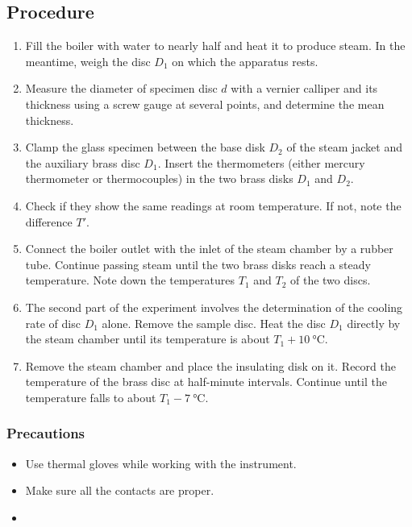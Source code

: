 \documentclass[%
 sor,
 jor,
 amsmath,amssymb,
 reprint,
]{revtex4-2}
\begin{document}
\subsection{Procedure}
\begin{enumerate}
    \item Fill the boiler with water to nearly half and heat it to produce steam. In the meantime, weigh the disc ${D_1}$ on which the apparatus rests.
    \item Measure the diameter of specimen disc $d$ with a vernier calliper and its thickness using a screw gauge at several points, and determine the mean thickness.
    \item Clamp the glass specimen between the base disk ${D_2}$ of the steam jacket and the auxiliary brass disc ${D_1}$. Insert the thermometers (either mercury thermometer or thermocouples) in the two brass disks ${D_1}$ and ${D_2}$.
    \item Check if they show the same readings at room temperature. If not, note the difference $T'$.
    \item Connect the boiler outlet with the inlet of the steam chamber by a rubber tube. Continue passing steam until the two brass disks reach a steady temperature. Note down the temperatures $T_1$ and $T_2$ of the two discs.
    \item The second part of the experiment involves the determination of the cooling rate of disc ${D_1}$ alone. Remove the sample disc. Heat the disc ${D_1}$ directly by the steam chamber until its temperature is about $T_1 + \SI{10}{\celsius}$.
    \item Remove the steam chamber and place the insulating disk on it. Record the temperature of the brass disc at half-minute intervals. Continue until the temperature falls to about $T_1 - \SI{7}{\celsius}$.
\end{enumerate}



\subsubsection{Precautions}
\begin{itemize}
	\item Use thermal gloves while working with the instrument.
	\item Make sure all the contacts are proper.
	\item 
\end{itemize}
\end{document}
